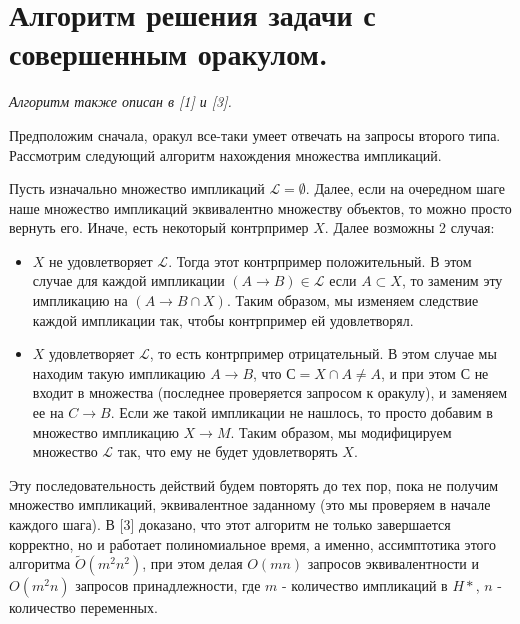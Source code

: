 \section{Алгоритм решения задачи с совершенным оракулом.}

\emph{Алгоритм также описан в [1] и [3].}

Предположим сначала, оракул все-таки умеет отвечать на запросы второго типа. Рассмотрим следующий алгоритм нахождения множества импликаций.

Пусть изначально множество импликаций $\mathcal{L} = \emptyset$. Далее, если на очередном шаге наше множество импликаций эквивалентно множеству объектов, то можно просто вернуть его. Иначе, есть некоторый контрпример $X$. Далее возможны 2 случая:

\begin{itemize}
	\item $X$ не удовлетворяет $\mathcal{L}$. Тогда этот контрпример положительный. В этом случае для каждой импликации $(A \rightarrow B) \in \mathcal{L}$ если $A \subset X$, то заменим эту импликацию на $(A \rightarrow B \cap X)$. Таким образом, мы изменяем следствие каждой импликации так, чтобы контрпример ей удовлетворял.
	\item $X$ удовлетворяет $\mathcal{L}$, то есть контрпример отрицательный. В этом случае мы находим такую импликацию $A \rightarrow B$, что $С = X \cap A \neq A$, и при этом $С$ не входит в множества (последнее проверяется запросом к оракулу), и заменяем ее на $C \rightarrow B$. Если же такой импликации не нашлось, то просто добавим в множество импликацию $X \rightarrow M$. Таким образом, мы модифицируем множество $\mathcal{L}$ так, что ему не будет удовлетворять $X$.
\end{itemize}

Эту последовательность действий будем повторять до тех пор, пока не получим множество импликаций, эквивалентное заданному (это мы проверяем в начале каждого шага). В [3] доказано, что этот алгоритм не только завершается корректно, но и работает полиномиальное время, а именно, ассимптотика этого алгоритма $\tilde{O}(m^2n^2)$, при этом делая $O(mn)$ запросов эквивалентности и $O(m^2n)$ запросов принадлежности, где $m$ - количество импликаций в $H*$, $n$ - количество переменных.